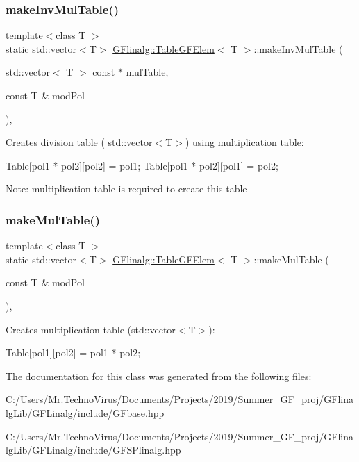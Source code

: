 \subsubsection{\texorpdfstring{makeInvMulTable()}{makeInvMulTable()}}
{\footnotesize\ttfamily template$<$class T $>$ \\
static std\+::vector$<$T$>$ \mbox{\hyperlink{class_g_flinalg_1_1_table_g_f_elem}{G\+Flinalg\+::\+Table\+G\+F\+Elem}}$<$ T $>$\+::make\+Inv\+Mul\+Table (\begin{DoxyParamCaption}\item[{std\+::vector$<$ T $>$ const $\ast$}]{mul\+Table,  }\item[{const T \&}]{mod\+Pol }\end{DoxyParamCaption})\hspace{0.3cm}{\ttfamily [inline]}, {\ttfamily [static]}}

Creates division table ( std\+::vector$<$\+T$>$) using multiplication table\+: \begin{DoxyVerb}Table[pol1 * pol2][pol2] = pol1;
Table[pol1 * pol2][pol1] = pol2;
\end{DoxyVerb}


Note\+: multiplication table is required to create this table \mbox{\label{class_g_flinalg_1_1_table_g_f_elem_abcf511c0564ce0dfba2da3fb412360e3}} 
\subsubsection{\texorpdfstring{makeMulTable()}{makeMulTable()}}
{\footnotesize\ttfamily template$<$class T $>$ \\
static std\+::vector$<$T$>$ \mbox{\hyperlink{class_g_flinalg_1_1_table_g_f_elem}{G\+Flinalg\+::\+Table\+G\+F\+Elem}}$<$ T $>$\+::make\+Mul\+Table (\begin{DoxyParamCaption}\item[{const T \&}]{mod\+Pol }\end{DoxyParamCaption})\hspace{0.3cm}{\ttfamily [inline]}, {\ttfamily [static]}}

Creates multiplication table (std\+::vector$<$\+T$>$)\+: \begin{DoxyVerb}Table[pol1][pol2] = pol1 * pol2;
\end{DoxyVerb}
 

The documentation for this class was generated from the following files\+:\begin{DoxyCompactItemize}
\item 
C\+:/\+Users/\+Mr.\+Techno\+Virus/\+Documents/\+Projects/2019/\+Summer\+\_\+\+G\+F\+\_\+proj/\+G\+Flinalg\+Lib/\+G\+F\+Linalg/include/G\+Fbase.\+hpp\item 
C\+:/\+Users/\+Mr.\+Techno\+Virus/\+Documents/\+Projects/2019/\+Summer\+\_\+\+G\+F\+\_\+proj/\+G\+Flinalg\+Lib/\+G\+F\+Linalg/include/G\+F\+S\+Plinalg.\+hpp\end{DoxyCompactItemize}
